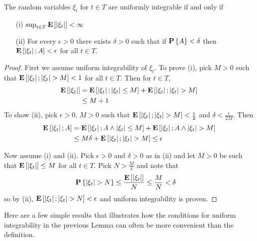 \begin{lem}\label{UniformIntegrabilityProperties}The random variables $\xi_t$ for $t \in T$ are uniformly
  integrable if and only if
\begin{itemize}
\item[(i)] $\sup_{t \in T} \textbf{E}\left[\left \vert \xi_t \right \vert\right] < \infty$
\item[(ii)] For every $\epsilon > 0$ there exists $\delta > 0$ such
  that if $\textbf{P}\left \{A \right \} < \delta$ then $\textbf{E}\left[\left \vert \xi_t \right \vert ;
    A\right] < \epsilon$ for all $t \in T$.
\end{itemize}
\end{lem}
\begin{proof}
First we assume uniform integrability of $\xi_t$.  To prove (i), pick
$M > 0$ such that $\textbf{E}\left[\left \vert \xi_t \right \vert ; \left \vert \xi_t \right \vert > M\right] < 1$
for all $t \in T$.  Then for $t \in T$,
\begin{align*}
\textbf{E}\left[\left \vert \xi_t \right \vert\right] &= \textbf{E}\left[\left \vert \xi_t \right \vert;\left \vert \xi_t \right \vert \leq  M
\right] + \textbf{E}\left[\left \vert \xi_t \right \vert; \left \vert \xi_t \right \vert > M\right] \\
&\leq M + 1
\end{align*}
To show (ii), pick $\epsilon > 0$, $M >0 $ such that
$\textbf{E}\left[\left \vert \xi_t \right \vert ; \left \vert \xi_t \right \vert > M\right] < \frac{\epsilon}{2}$ and
$\delta < \frac{\epsilon}{2M}$.
Then
\begin{align*}
\textbf{E}\left[\left \vert \xi_t \right \vert ; A\right] &= \textbf{E}\left[\left \vert \xi_t \right \vert ; A \wedge
  \left \vert \xi_t \right \vert \leq M\right] + \textbf{E}\left[\left \vert \xi_t \right \vert ; A \wedge
  \left \vert \xi_t \right \vert > M\right] \\
&\leq M \delta + \textbf{E}\left[\left \vert \xi_t \right \vert ;   \left \vert \xi_t \right \vert > M\right] \leq \epsilon
\end{align*}

Now assume (i) and (ii).  Pick $\epsilon > 0$ and $\delta >0 $ as in
(ii) and let $M > 0$ be such that $\textbf{E}\left[\left \vert \xi_t \right \vert\right] \leq M$ for all
$t \in T$.  Pick $N > \frac{M}{\delta}$ and note that
\begin{align*}
\textbf{P}\left \{\left \vert \xi_t \right \vert > N \right \} &\leq \frac{\textbf{E}\left[\left \vert \xi_t \right \vert
  \right]}{N} \leq \frac{M}{N} < \delta
\end{align*}
so by (ii), $\textbf{E}\left[\left \vert \xi_t \right \vert; \left \vert \xi_t \right \vert > N\right] < \epsilon$
and uniform integrability is proven.
\end{proof}

Here are a few simple results that illustrates how the conditions for
uniform integrability in the previous Lemma can often be more
convenient than the definition.

